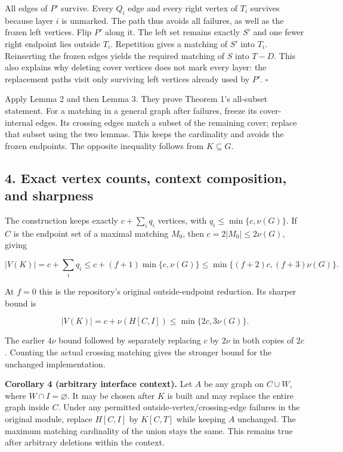 All edges of \(P'\) survive. Every \(Q_i\) edge and every right vertex of \(T_i\) survives because layer \(i\) is unmarked. The path thus avoids all failures, as well as the frozen left vertices. Flip \(P'\) along it. The left set remains exactly \(S'\) and one fewer right endpoint lies outside \(T_i\). Repetition gives a matching of \(S'\) into \(T_i\). Reinserting the frozen edges yields the required matching of \(S\) into \(T-D\). This also explains why deleting cover vertices does not mark every layer: the replacement paths visit only surviving left vertices already used by \(P'\). \hfill\(\square\)

Apply Lemma 2 and then Lemma 3. They prove Theorem 1's all-subset statement. For a matching in a general graph after failures, freeze its cover-internal edges. Its crossing edges match a subset of the remaining cover; replace that subset using the two lemmas. This keeps the cardinality and avoids the frozen endpoints. The opposite inequality follows from \(K\subseteq G\).

\hypertarget{af-321c79486f-exact-vertex-counts-context-composition-and-sharpness}{%
\subsection{4. Exact vertex counts, context composition, and sharpness}\label{af-321c79486f-exact-vertex-counts-context-composition-and-sharpness}}

The construction keeps exactly \(c+\sum_iq_i\) vertices, with \(q_i\leq\min\{c,\nu(G)\}\). If \(C\) is the endpoint set of a maximal matching \(M_0\), then \(c=2|M_0|\leq2\nu(G)\), giving

\[
|V(K)|=c+\sum_iq_i
\leq c+(f+1)\min\{c,\nu(G)\}
\leq\min\{(f+2)c,(f+3)\nu(G)\}.
\]

At \(f=0\) this is the repository's original outside-endpoint reduction. Its sharper bound is

\[
|V(K)|=c+\nu(H[C,I])\leq\min\{2c,3\nu(G)\}.
\]

The earlier \(4\nu\) bound followed by separately replacing \(c\) by \(2\nu\) in both copies of \(2c\). Counting the actual crossing matching gives the stronger bound for the unchanged implementation.

\textbf{Corollary 4 (arbitrary interface context).} Let \(A\) be any graph on \(C\cup W\), where \(W\cap I=\varnothing\). It may be chosen after \(K\) is built and may replace the entire graph inside \(C\). Under any permitted outside-vertex/crossing-edge failures in the original module, replace \(H[C,I]\) by \(K[C,T]\) while keeping \(A\) unchanged. The maximum matching cardinality of the union stays the same. This remains true after arbitrary deletions within the context.

